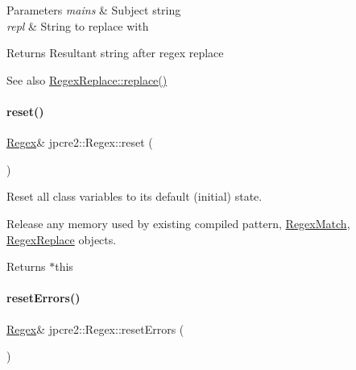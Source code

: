 \begin{DoxyParams}{Parameters}
{\em mains} & Subject string \\
\hline
{\em repl} & String to replace with \\
\hline
\end{DoxyParams}
\begin{DoxyReturn}{Returns}
Resultant string after regex replace 
\end{DoxyReturn}
\begin{DoxySeeAlso}{See also}
\hyperlink{classjpcre2_1_1RegexReplace_afd087fa7a9bfedec802d1a3dd7edbdd0_afd087fa7a9bfedec802d1a3dd7edbdd0}{Regex\+Replace\+::replace()} 
\end{DoxySeeAlso}
\hypertarget{classjpcre2_1_1Regex_a91f6afe257e9633cbb79a98649ab8d02_a91f6afe257e9633cbb79a98649ab8d02}{}\label{classjpcre2_1_1Regex_a91f6afe257e9633cbb79a98649ab8d02_a91f6afe257e9633cbb79a98649ab8d02} 
\paragraph{\texorpdfstring{reset()}{reset()}}
{\footnotesize\ttfamily \hyperlink{classjpcre2_1_1Regex}{Regex}\& jpcre2\+::\+Regex\+::reset (\begin{DoxyParamCaption}{ }\end{DoxyParamCaption})\hspace{0.3cm}{\ttfamily [inline]}}



Reset all class variables to its default (initial) state. 

Release any memory used by existing compiled pattern, \hyperlink{classjpcre2_1_1RegexMatch}{Regex\+Match}, \hyperlink{classjpcre2_1_1RegexReplace}{Regex\+Replace} objects. \begin{DoxyReturn}{Returns}
$\ast$this 
\end{DoxyReturn}
\hypertarget{classjpcre2_1_1Regex_aff12a6e75ecd3e623875d12df49b3b89_aff12a6e75ecd3e623875d12df49b3b89}{}\label{classjpcre2_1_1Regex_aff12a6e75ecd3e623875d12df49b3b89_aff12a6e75ecd3e623875d12df49b3b89} 
\paragraph{\texorpdfstring{reset\+Errors()}{resetErrors()}}
{\footnotesize\ttfamily \hyperlink{classjpcre2_1_1Regex}{Regex}\& jpcre2\+::\+Regex\+::reset\+Errors (\begin{DoxyParamCaption}{ }\end{DoxyParamCaption})\hspace{0.3cm}{\ttfamily [inline]}}



